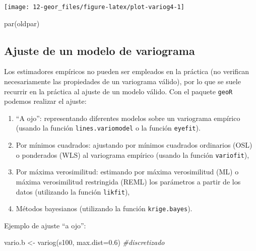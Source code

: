 \documentclass[
  spanish,
]{book}
\newenvironment{Shaded}{\begin{snugshade}}{\end{snugshade}}
\newcommand{\AttributeTok}[1]{\textcolor[rgb]{0.77,0.63,0.00}{#1}}
\newcommand{\CommentTok}[1]{\textcolor[rgb]{0.56,0.35,0.01}{\textit{#1}}}
\newcommand{\FloatTok}[1]{\textcolor[rgb]{0.00,0.00,0.81}{#1}}
\newcommand{\FunctionTok}[1]{\textcolor[rgb]{0.00,0.00,0.00}{#1}}
\newcommand{\NormalTok}[1]{#1}
\newcommand{\OtherTok}[1]{\textcolor[rgb]{0.56,0.35,0.01}{#1}}
\theoremstyle{break}
\begin{document}
\begin{center}\texttt{[image: 12-geor\_files/figure-latex/plot-variog4-1]} \end{center}

\begin{Shaded}
\begin{Highlighting}[]
\FunctionTok{par}\NormalTok{(oldpar)}
\end{Highlighting}
\end{Shaded}

\hypertarget{ajuste-de-un-modelo-de-variograma}{%
\subsection{Ajuste de un modelo de variograma}\label{ajuste-de-un-modelo-de-variograma}}

Los estimadores empíricos no pueden ser empleados en la práctica (no
verifican necesariamente las propiedades de un variograma válido), por
lo que se suele recurrir en la práctica al ajuste de un modelo válido.
Con el paquete \texttt{geoR} podemos realizar el ajuste:

\begin{enumerate}
\def\labelenumi{\arabic{enumi}.}
\item
  ``A ojo'': representando diferentes modelos sobre un variograma
  empírico (usando la función \texttt{lines.variomodel} o la función
  \texttt{eyefit}).
\item
  Por mínimos cuadrados: ajustando por mínimos cuadrados
  ordinarios (OSL) o ponderados (WLS) al variograma empírico (usando
  la función \texttt{variofit}),
\item
  Por máxima verosimilitud: estimando por máxima verosimilitud (ML) o
  máxima verosimilitud restringida (REML) los parámetros a partir de
  los datos (utilizando la función \texttt{likfit}),
\item
  Métodos bayesianos (utilizando la función \texttt{krige.bayes}).
\end{enumerate}

Ejemplo de ajuste ``a ojo'':

\begin{Shaded}
\begin{Highlighting}[]
\NormalTok{vario.b }\OtherTok{\textless{}{-}} \FunctionTok{variog}\NormalTok{(s100, }\AttributeTok{max.dist=}\FloatTok{0.6}\NormalTok{) }\CommentTok{\#discretizado}
\end{Highlighting}
\end{Shaded}
\end{document}
